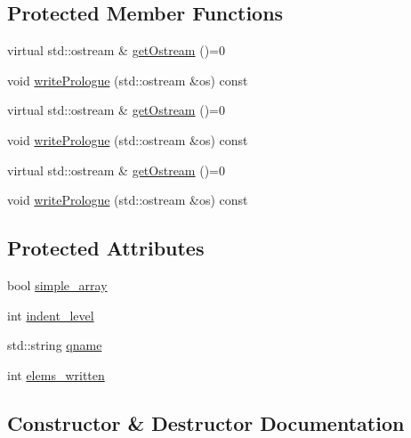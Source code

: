 \subsection*{Protected Member Functions}
\begin{DoxyCompactItemize}
\item 
virtual std\+::ostream \& \mbox{\hyperlink{classXMLStructWriterAPI_1_1XMLStructWriterBase_a48da05057c9f4a021fbe910867bb5f2c}{get\+Ostream}} ()=0
\item 
void \mbox{\hyperlink{classXMLStructWriterAPI_1_1XMLStructWriterBase_a7b8ba2adefb35aa0a0588869b7cca47e}{write\+Prologue}} (std\+::ostream \&os) const
\item 
virtual std\+::ostream \& \mbox{\hyperlink{classXMLStructWriterAPI_1_1XMLStructWriterBase_a48da05057c9f4a021fbe910867bb5f2c}{get\+Ostream}} ()=0
\item 
void \mbox{\hyperlink{classXMLStructWriterAPI_1_1XMLStructWriterBase_a7b8ba2adefb35aa0a0588869b7cca47e}{write\+Prologue}} (std\+::ostream \&os) const
\item 
virtual std\+::ostream \& \mbox{\hyperlink{classXMLStructWriterAPI_1_1XMLStructWriterBase_a48da05057c9f4a021fbe910867bb5f2c}{get\+Ostream}} ()=0
\item 
void \mbox{\hyperlink{classXMLStructWriterAPI_1_1XMLStructWriterBase_a7b8ba2adefb35aa0a0588869b7cca47e}{write\+Prologue}} (std\+::ostream \&os) const
\end{DoxyCompactItemize}
\subsection*{Protected Attributes}
\begin{DoxyCompactItemize}
\item 
bool \mbox{\hyperlink{classXMLStructWriterAPI_1_1XMLStructWriterBase_aee86d78c7ddfc0c64ad946f5d0b8f231}{simple\+\_\+array}}
\item 
int \mbox{\hyperlink{classXMLStructWriterAPI_1_1XMLStructWriterBase_ac592a077855a1377b390f4abff506e38}{indent\+\_\+level}}
\item 
std\+::string \mbox{\hyperlink{classXMLStructWriterAPI_1_1XMLStructWriterBase_a94807da702e56447a602aeae8fb6d9e5}{qname}}
\item 
int \mbox{\hyperlink{classXMLStructWriterAPI_1_1XMLStructWriterBase_a255acd33078c52b9bd9b1f0414cd03e3}{elems\+\_\+written}}
\end{DoxyCompactItemize}


\subsection{Constructor \& Destructor Documentation}
\mbox{\label{classXMLStructWriterAPI_1_1XMLStructWriterBase_a502490c6d71df950eb4ffa61388c12e9}} 
